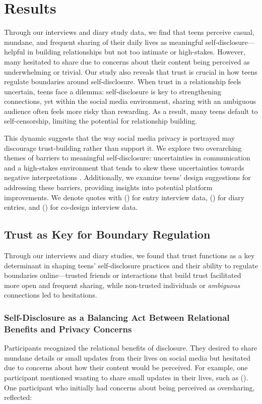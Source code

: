 \section{Results}
\label{section:4}
Through our interviews and diary study data, we find that teens perceive casual, mundane, and frequent sharing of their daily lives as meaningful self-disclosure---helpful in building relationships but not too intimate or high-stakes. However, many hesitated to share due to concerns about their content being perceived as underwhelming or trivial. Our study also reveals that trust is crucial in how teens regulate boundaries around self-disclosure. When trust in a relationship feels uncertain, teens face a dilemma: self-disclosure is key to strengthening connections, yet within the social media environment, sharing with an ambiguous audience often feels more risky than rewarding. As a result, many teens default to self-censorship, limiting the potential for relationship building.

This dynamic suggests that the way social media privacy is portrayed may discourage trust-building rather than support it. We explore two overarching themes of barriers to meaningful self-disclosure: uncertainties in communication  and a high-stakes environment that tends to skew these uncertainties towards negative interpretations . Additionally, we examine teens' design suggestions for addressing these barriers, providing insights into potential platform improvements. We denote quotes with () for entry interview data, () for diary entries, and () for co-design interview data.

\subsection{Trust as Key for Boundary Regulation}
\label{section:4-1}
Through our interviews and diary studies, we found that trust functions as a key determinant in shaping teens' self-disclosure practices and their ability to regulate boundaries online---trusted friends or interactions that build trust facilitated more open and frequent sharing, while non-trusted individuals or \textit{ambiguous} connections led to hesitations.


\subsubsection{\textbf{Self-Disclosure as a Balancing Act Between Relational Benefits and Privacy Concerns}}
\label{section:4-1-1}
Participants recognized the relational benefits of disclosure. They desired to share mundane details or small updates from their lives on social media but hesitated due to concerns about how their content would be perceived. For example, one participant mentioned wanting to share small updates in their lives, such as  (). One participant who initially had concerns about being perceived as oversharing, reflected: 

